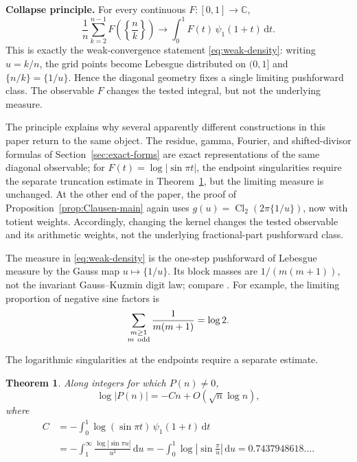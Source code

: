 \documentclass[11pt]{amsart}
\numberwithin{equation}{section}
\newtheorem{theorem}{Theorem}[section]
\theoremstyle{definition}
\theoremstyle{remark}
\newcommand{\dd}{\,\mathrm d}
\begin{document}
\medskip
\noindent\textbf{Collapse principle.}
For every continuous \(F:[0,1]\to\mathbb C\),
\begin{equation}\label{eq:collapse}
 \frac1n\sum_{k=2}^{n-1}F\!\left(\left\{\frac nk\right\}\right)
 \longrightarrow
 \int_0^1 F(t)\,\psi_1(1+t)\dd t.
\end{equation}
This is exactly the weak-convergence statement \eqref{eq:weak-density}:
writing \(u=k/n\), the grid points become Lebesgue distributed on
\((0,1]\) and \(\{n/k\}=\{1/u\}\).  Hence the diagonal geometry fixes a
single limiting pushforward class.  The observable \(F\) changes the tested
integral, but not the underlying measure.

The principle explains why several apparently different constructions in
this paper return to the same object.  The residue, gamma, Fourier, and
shifted-divisor formulas of Section~\ref{sec:exact-forms} are exact
representations of the same diagonal observable; for
\(F(t)=\log|\sin\pi t|\), the endpoint singularities require the separate
truncation estimate in Theorem~\ref{thm:scale}, but the limiting measure is
unchanged.  At the other end of the paper, the proof of
Proposition~\ref{prop:Clausen-main} again uses
\(g(u)=\operatorname{Cl}_2(2\pi\{1/u\})\), now with totient weights.
Accordingly, changing the kernel changes the tested observable and its
arithmetic weights, not the underlying fractional-part pushforward class.

The measure in \eqref{eq:weak-density} is the one-step pushforward of
Lebesgue measure by the Gauss map \(u\mapsto\{1/u\}\).  Its block masses
are \(1/(m(m+1))\), not the invariant Gauss--Kuzmin digit law; compare
\cite{Mayer1989}.  For example, the limiting proportion of negative sine
factors is
\begin{equation}\label{eq:negative-proportion}
 \sum_{\substack{m\geq1\\m\ {\rm odd}}}\frac1{m(m+1)}=\log2.
\end{equation}

The logarithmic singularities at the endpoints require a separate
estimate.

\begin{theorem}\label{thm:scale}
Along integers for which \(P(n)\ne0\),
\begin{equation}\label{eq:scale}
 \log|P(n)|=-Cn+O(\sqrt n\log n),
\end{equation}
where
\begin{align}
 C
 &=-\int_0^1\log(\sin\pi t)\,\psi_1(1+t)\dd t\label{eq:C-density}\\
 &=-\int_1^\infty\frac{\log|\sin\pi u|}{u^2}\dd u
 =-\int_0^1\log\left|\sin\frac{\pi}{u}\right|\dd u
 =0.7437948618\ldots.\label{eq:C-integrals}
\end{align}
\end{theorem}
\end{document}
